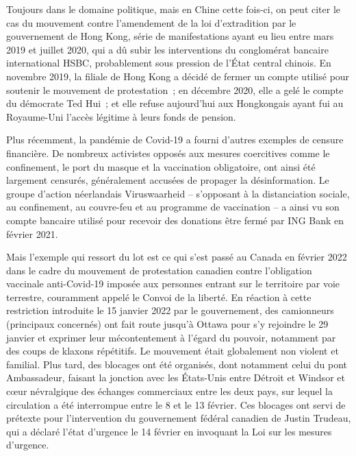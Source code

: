 Toujours dans le domaine politique, mais en Chine cette fois-ci, on peut citer le cas du mouvement contre l'amendement de la loi d'extradition par le gouvernement de Hong Kong, série de manifestations ayant eu lieu entre mars 2019 et juillet 2020, qui a dû subir les interventions du conglomérat bancaire international HSBC, probablement sous pression de l'État central chinois. En novembre 2019, la filiale de Hong Kong a décidé de fermer un compte utilisé pour soutenir le mouvement de protestation~; en décembre 2020, elle a gelé le compte du démocrate Ted Hui~; et elle refuse aujourd'hui aux Hongkongais ayant fui au Royaume-Uni l'accès légitime à leurs fonds de pension.

Plus récemment, la pandémie de Covid-19 a fourni d'autres exemples de censure financière. De nombreux activistes opposés aux mesures coercitives comme le confinement, le port du masque et la vaccination obligatoire, ont ainsi été largement censurés, généralement accusées de propager la désinformation. Le groupe d'action néerlandais Viruswaarheid -- s'opposant à la distanciation sociale, au confinement, au couvre-feu et au programme de vaccination -- a ainsi vu son compte bancaire utilisé pour recevoir des donations être fermé par ING Bank en février 2021.

Mais l'exemple qui ressort du lot est ce qui s'est passé au Canada en février 2022 dans le cadre du mouvement de protestation canadien contre l'obligation vaccinale anti-Covid-19 imposée aux personnes entrant sur le territoire par voie terrestre, couramment appelé le Convoi de la liberté. En réaction à cette restriction introduite le 15 janvier 2022 par le gouvernement, des camionneurs (principaux concernés) ont fait route jusqu'à Ottawa pour s'y rejoindre le 29 janvier et exprimer leur mécontentement à l'égard du pouvoir, notamment par des coups de klaxons répétitifs. Le mouvement était globalement non violent et familial. Plus tard, des blocages ont été organisés, dont notamment celui du pont Ambassadeur, faisant la jonction avec les États-Unis entre Détroit et Windsor et cœur névralgique des échanges commerciaux entre les deux pays, sur lequel la circulation a été interrompue entre le 8 et le 13 février. Ces blocages ont servi de prétexte pour l'intervention du gouvernement fédéral canadien de Justin Trudeau, qui a déclaré l'état d'urgence le 14 février en invoquant la Loi sur les mesures d'urgence.


